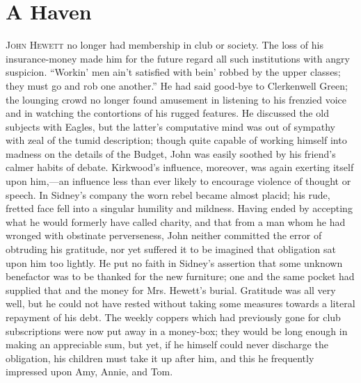 \chapter{A Haven}

\textsc{John Hewett} no longer had membership in club or society. The
loss of his insurance-money made him for the future regard all such
institutions with angry suspicion. ``Workin' men ain't satisfied with
bein' robbed by the upper classes; they must go and rob one another.''
He had said good-bye to Clerkenwell Green; the lounging crowd no longer
found amusement in listening to his frenzied voice and in watching the
contortions of his rugged features. He discussed the old subjects with
Eagles, but the latter's computative mind was out of sympathy with zeal
of the tumid description; though quite capable of working himself into
madness on the details of the Budget, John was easily soothed by his
friend's calmer habits of debate. Kirkwood's influence, moreover, was
again exerting itself {}upon him,---an influence less than ever likely
to encourage violence of thought or speech. In Sidney's company the worn
rebel became almost placid; his rude, fretted face fell into a singular
humility and mildness. Having ended by accepting what he would formerly
have called charity, and that from a man whom he had wronged with
obstinate perverseness, John neither committed the error of obtruding
his gratitude, nor yet suffered it to be imagined that obligation sat
upon him too lightly. He put no faith in Sidney's assertion that some
unknown benefactor was to be thanked for the new furniture; one and the
same pocket had supplied that and the money for Mrs. Hewett's burial.
Gratitude was all very well, but he could not have rested without taking
some measures towards a literal repayment of his debt. The weekly
coppers which had previously gone for club subscriptions were now put
away in a money-box; they would be long enough in making an appreciable
sum, but yet, if he himself could never discharge the obligation, his
children must take it up after him, and this he frequently impressed
upon Amy, Annie, and Tom.

